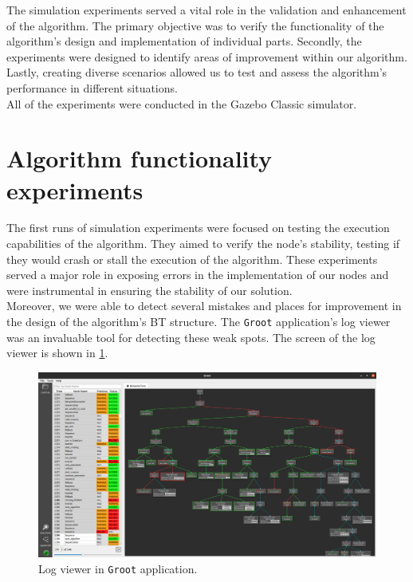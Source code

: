 The simulation experiments served a vital role in the validation and enhancement of the algorithm. The primary objective was to verify the functionality of the algorithm's design and implementation of individual parts. Secondly, the experiments were designed to identify areas of improvement within our algorithm. Lastly, creating diverse scenarios allowed us to test and assess the algorithm's performance in different situations.\\
All of the experiments were conducted in the Gazebo Classic simulator.
\section{Algorithm functionality experiments}
    The first runs of simulation experiments were focused on testing the execution capabilities of the algorithm. They aimed to verify the node's stability, testing if they would crash or stall the execution of the algorithm. These experiments served a major role in exposing errors in the implementation of our nodes and were instrumental in ensuring the stability of our solution.\\
    Moreover, we were able to detect several mistakes and places for improvement in the design of the algorithm's BT structure. The \texttt{Groot} application's log viewer was an invaluable tool for detecting these weak spots. The screen of the log viewer is shown in \ref{fig:log_viewer}.
    \begin{figure}[ht]
        \centering
        \includegraphics[width=\linewidth]{images/log_viewer.png}
        \caption{Log viewer in \texttt{Groot} application.}
        \label{fig:log_viewer}
    \end{figure}
